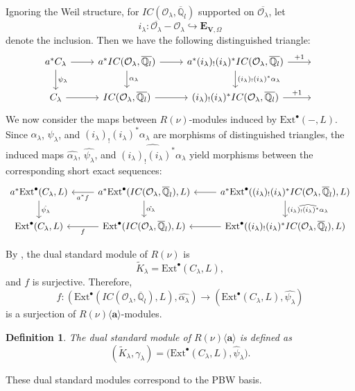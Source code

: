\documentclass[10pt,a4paper]{amsart}
\newtheorem{definition}[theorem]{Definition}
\newcommand\mo{{\mathcal{O}}}
\begin{document}
Ignoring the Weil structure, for $IC(\mathcal{O}_{\lambda}, \overline{\mathbb{Q}}_l)$ supported on $\overline{\mathcal{O}_{\lambda}}$, let
\[
i_{\lambda} : \overline{\mathcal{O}_{\lambda}} - \mathcal{O}_{\lambda} \hookrightarrow \mathbf{E}_{\mathbf{V},\Omega}
\]
denote the inclusion. Then we have the following distinguished triangle:
\begin{equation}
\begin{tikzcd}
a^*C_{\lambda} \arrow[d, "\psi_{\lambda}"] \arrow[r] & {a^*IC(\mo_{\lambda},\overline{\bbQ_{l}})} \arrow[d, "\alpha_{\lambda}"] \arrow[r] & {a^*(i_{\lambda})_!(i_{\lambda})^*IC(\mo_{\lambda},\overline{\bbQ_{l}})} \arrow[d, "(i_{\lambda})_!(i_{\lambda})^*\alpha_{\lambda}"] \arrow[r, "+1"] & {} \\
C_{\lambda} \arrow[r]                                & {IC(\mo_{\lambda},\overline{\bbQ_{l}})} \arrow[r]                                  & {(i_{\lambda})_!(i_{\lambda})^*IC(\mo_{\lambda},\overline{\bbQ_{l}})} \arrow[r, "+1"]                                                                & {}
\end{tikzcd}
\end{equation}
We now consider the maps between $R(\nu)$-modules induced by $\mathrm{Ext}^{\bullet}(-, L)$. Since $\alpha_{\lambda}$, $\psi_{\lambda}$, and $(i_{\lambda})_! (i_{\lambda})^* \alpha_{\lambda}$ are morphisms of distinguished triangles, the induced maps $\hat{\alpha_{\lambda}}$, $\hat{\psi_{\lambda}}$, and $\widehat{(i_{\lambda})_! (i_{\lambda})^* \alpha_{\lambda}}$ yield morphisms between the corresponding short exact sequences:
\[
\begin{tikzcd}
a^* \mathrm{Ext}^{\bullet}(C_{\lambda}, L) \arrow[d, "\hat{\psi_{\lambda}}"] & 
a^* \mathrm{Ext}^{\bullet}(IC(\mathcal{O}_{\lambda}, \overline{\mathbb{Q}}_l), L) \arrow[d, "\hat{\alpha_{\lambda}}"] \arrow[l, "a^*f"] & 
a^* \mathrm{Ext}^{\bullet}((i_{\lambda})_!(i_{\lambda})^* IC(\mathcal{O}_{\lambda}, \overline{\mathbb{Q}}_l), L) \arrow[d, "\widehat{(i_{\lambda})_!(i_{\lambda})^* \alpha_{\lambda}}"] \arrow[l] \\
\mathrm{Ext}^{\bullet}(C_{\lambda}, L) & 
\mathrm{Ext}^{\bullet}(IC(\mathcal{O}_{\lambda}, \overline{\mathbb{Q}}_l), L) \arrow[l, "f"] & 
\mathrm{Ext}^{\bullet}((i_{\lambda})_!(i_{\lambda})^* IC(\mathcal{O}_{\lambda}, \overline{\mathbb{Q}}_l), L) \arrow[l]
\end{tikzcd}
\]

By \cite[Theorem 2.7]{cd088214-009e-3813-9a86-97f9a299a24c}, the dual standard module of $R(\nu)$ is
\[
\widetilde{K}_{\lambda} = \mathrm{Ext}^{\bullet}(C_{\lambda}, L),
\]
and $f$ is surjective. Therefore,
\[
f : (\mathrm{Ext}^{\bullet}(IC(\mathcal{O}_{\lambda}, \overline{\mathbb{Q}}_l), L), \hat{\alpha_{\lambda}}) \to (\mathrm{Ext}^{\bullet}(C_{\lambda}, L), \hat{\psi_{\lambda}})
\]
is a surjection of $R(\nu)\langle\mathbf{a}\rangle$-modules.
\begin{definition}
   The dual standard module of $R(\nu)\langle\mathbf{a}\rangle$ is defined as 
\[
(\widetilde{K}_{\lambda}, \gamma_{\lambda}) = \bigl(\mathrm{Ext}^{\bullet}(C_{\lambda}, L), \hat{\psi}_{\lambda}\bigr).
\]
\end{definition}
These dual standard modules correspond to the PBW basis.
\end{document}
